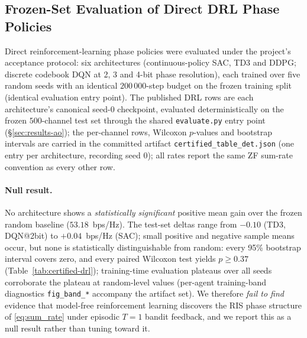 \subsection{Frozen-Set Evaluation of Direct DRL Phase Policies}
\label{sec:results-drl}

Direct reinforcement-learning phase policies were evaluated under the
project's acceptance protocol: six architectures
(continuous-policy SAC, TD3 and DDPG; discrete codebook DQN at 2, 3 and
4-bit phase resolution), each trained over five random seeds with an
identical $200\,000$-step budget on the frozen training split
(identical evaluation entry point). The published DRL rows are each architecture's canonical
seed-0 checkpoint, evaluated deterministically on the frozen $500$-channel test
set through the shared \texttt{evaluate.py} entry point (\S\ref{sec:results-ao});
the per-channel rows, Wilcoxon $p$-values and bootstrap intervals are
carried in the committed artifact \texttt{certified\_table\_det.json} (one entry per
architecture, recording seed 0); all rates report the same ZF sum-rate convention as
every other row.

\paragraph{Null result.}
No architecture shows a \emph{statistically significant} positive
mean gain over the frozen random baseline ($53.18$~bps/Hz). The
test-set deltas range from $-0.10$ (TD3, DQN@2bit) to
$+0.04$~bps/Hz (SAC); small positive and negative sample means occur,
but none is statistically distinguishable from random: every 95\%
bootstrap interval covers zero, and every paired Wilcoxon test yields
$p \geq 0.37$
(Table~\ref{tab:certified-drl}); training-time evaluation plateaus
over all seeds corroborate the plateau at random-level values
(per-agent training-band diagnostics \texttt{fig\_band\_*} accompany
the artifact set). We therefore \emph{fail to find} evidence
that model-free reinforcement learning discovers the RIS phase
structure of \eqref{eq:sum_rate} under episodic $T{=}1$ bandit
feedback, and we report this as a null result rather than tuning
toward it.

